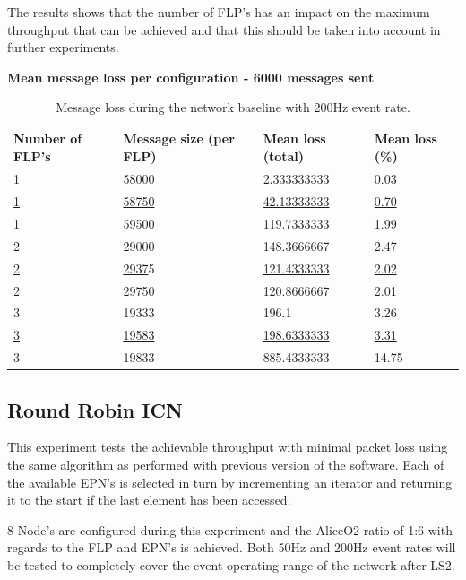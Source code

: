 \documentclass[]{article}
\begin{document}
The results shows that the number of FLP’s has an impact on the maximum throughput that can be achieved and that this should be taken into account in further experiments. 

\begin{table}[H]
	\textbf{Mean message loss per configuration - 6000 messages sent}
	\begin{center}
		\begin{tabular}{ | l | l | l | l |}
			\hline
			\textbf{Number of FLP’s} & \textbf{Message size (per FLP)} & \textbf{Mean loss (total)} & \textbf{Mean loss (\%)} \\ \hline
			
			1 & 58000 & 2.333333333 & 0.03 \\ \hline
			\underline{1} & \underline{58750} & \underline{42.13333333} & \underline{0.70} \\ \hline
			1 & 59500 & 119.7333333 & 1.99 \\ \hline
			
			2 & 29000 & 148.3666667 & 2.47 \\ \hline
			\underline{2} & \underline{2937}5 & \underline{121.4333333} & \underline{2.02} \\ \hline
			2 & 29750 & 120.8666667 & 2.01 \\ \hline
			
			3 & 19333 & 196.1 & 3.26 \\ \hline
			\underline{3} & \underline{19583} & \underline{198.6333333} & \underline{3.31} \\ \hline
			3 & 19833 & 885.4333333 & 14.75 \\ \hline
		\end{tabular}
		\caption{Message loss during the network baseline with 200Hz event rate.}
		\label{tab:specs}
	\end{center}
\end{table}


\subsection{Round Robin ICN}
This experiment tests the achievable throughput with minimal packet loss using the same algorithm as performed with previous version of the software. Each of the available EPN’s is selected in turn by incrementing an iterator and returning it to the start if the last element has been accessed. 

8 Node’s are configured during this experiment and the AliceO2 ratio of 1:6 with regards to the FLP and EPN’s is achieved. Both 50Hz and 200Hz event rates will be tested to completely cover the event operating range of the network after LS2.
\end{document}
